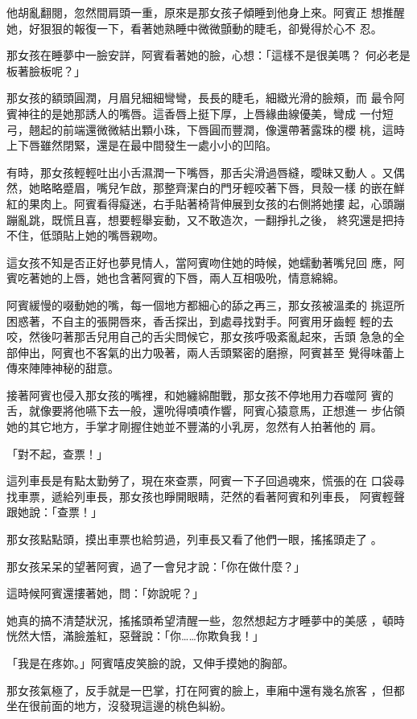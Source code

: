 他胡亂翻閱，忽然間肩頭一重，原來是那女孩子傾睡到他身上來。阿賓正
想推醒她，好狠狠的報復一下，看著她熟睡中微微顫動的睫毛，卻覺得於心不
忍。

那女孩在睡夢中一臉安詳，阿賓看著她的臉，心想：「這樣不是很美嗎？
何必老是板著臉板呢？」

那女孩的額頭圓潤，月眉兒細細彎彎，長長的睫毛，細緻光滑的臉頰，而
最令阿賓神往的是她那誘人的嘴唇。這香唇上挺下厚，上唇緣曲線優美，彎成
一付短弓，翹起的前端還微微結出顆小珠，下唇圓而豐潤，像還帶著露珠的櫻
桃，這時上下唇雖然閉緊，還是在最中間發生一處小小的凹陷。

有時，那女孩輕輕吐出小舌濕潤一下嘴唇，那舌尖滑過唇縫，曖昧又動人
。又偶然，她略略蹙眉，嘴兒乍啟，那整齊潔白的門牙輕咬著下唇，貝殼一樣
的嵌在鮮紅的果肉上。阿賓看得癡迷，右手貼著椅背伸展到女孩的右側將她摟
起，心頭蹦蹦亂跳，既慌且喜，想要輕舉妄動，又不敢造次，一翻掙扎之後，
終究還是把持不住，低頭貼上她的嘴唇親吻。

這女孩不知是否正好也夢見情人，當阿賓吻住她的時候，她蠕動著嘴兒回
應，阿賓吃著她的上唇，她也含著阿賓的下唇，兩人互相吸吮，情意綿綿。

阿賓緩慢的啜動她的嘴，每一個地方都細心的舔之再三，那女孩被溫柔的
挑逗所困惑著，不自主的張開唇來，香舌探出，到處尋找對手。阿賓用牙齒輕
輕的去咬，然後叼著那舌兒用自己的舌尖問候它，那女孩呼吸紊亂起來，舌頭
急急的全部伸出，阿賓也不客氣的出力吸著，兩人舌頭緊密的磨擦，阿賓甚至
覺得味蕾上傳來陣陣神秘的甜意。

接著阿賓也侵入那女孩的嘴裡，和她纏綿酣戰，那女孩不停地用力吞噬阿
賓的舌，就像要將他嚥下去一般，還吮得嘖嘖作響，阿賓心猿意馬，正想進一
步佔領她的其它地方，手掌才剛握住她並不豐滿的小乳房，忽然有人拍著他的
肩。

「對不起，查票！」

這列車長是有點太勤勞了，現在來查票，阿賓一下子回過魂來，慌張的在
口袋尋找車票，遞給列車長，那女孩也睜開眼睛，茫然的看著阿賓和列車長，
阿賓輕聲跟她說：「查票！」

那女孩點點頭，摸出車票也給剪過，列車長又看了他們一眼，搖搖頭走了
。

那女孩呆呆的望著阿賓，過了一會兒才說：「你在做什麼？」

這時候阿賓還摟著她，問：「妳說呢？」

她真的搞不清楚狀況，搖搖頭希望清醒一些，忽然想起方才睡夢中的美感
，頓時恍然大悟，滿臉羞紅，惡聲說：「你……你欺負我！」

「我是在疼妳。」阿賓嘻皮笑臉的說，又伸手摸她的胸部。

那女孩氣極了，反手就是一巴掌，打在阿賓的臉上，車廂中還有幾名旅客
，但都坐在很前面的地方，沒發現這邊的桃色糾紛。

